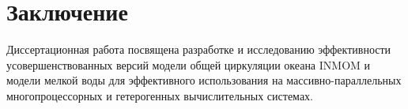\chapter*{Заключение}                       %


Диссертационная работа посвящена разработке и исследованию эффективности усовершенствованных версий модели общей циркуляции океана INMOM и модели мелкой воды для эффективного использования на массивно-параллельных многопроцессорных и гетерогенных вычислительных системах.

%


